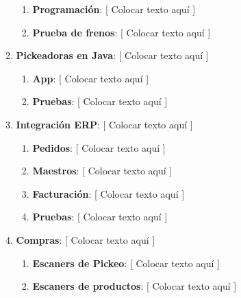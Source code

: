 \documentclass{article}
\begin{document}
\begin{enumerate}
\begin{enumerate}[label*=\arabic*.]
\begin{enumerate}[label*=\arabic*.]
						\item \textbf{Programación}: [ Colocar texto aquí ]

						\item \textbf{Prueba de frenos}: [ Colocar texto aquí ]

					\end{enumerate}

				\item \textbf{Pickeadoras en Java}: [ Colocar texto aquí ]

					\begin{enumerate}[label*=\arabic*.]
						\itemsep=3pt \topsep=0pt \partopsep=0pt \parskip=0pt \parsep=0pt

						\item \textbf{App}: [ Colocar texto aquí ]

						\item \textbf{Pruebas}: [ Colocar texto aquí ]

					\end{enumerate}

				\item \textbf{Integración ERP}: [ Colocar texto aquí ]

					\begin{enumerate}[label*=\arabic*.]
						\itemsep=3pt \topsep=0pt \partopsep=0pt \parskip=0pt \parsep=0pt

						\item \textbf{Pedidos}: [ Colocar texto aquí ]

						\item \textbf{Maestros}: [ Colocar texto aquí ]

						\item \textbf{Facturación}: [ Colocar texto aquí ]

						\item \textbf{Pruebas}: [ Colocar texto aquí ]

					\end{enumerate}
			
				\item \textbf{Compras}: [ Colocar texto aquí ]

					\begin{enumerate}[label*=\arabic*.]
						\itemsep=3pt \topsep=0pt \partopsep=0pt \parskip=0pt \parsep=0pt

						\item \textbf{Escaners de Pickeo}: [ Colocar texto aquí ]

						\item \textbf{Escaners de productos}: [ Colocar texto aquí ]


\end{enumerate}
\end{enumerate}
\end{enumerate}
\end{document}
